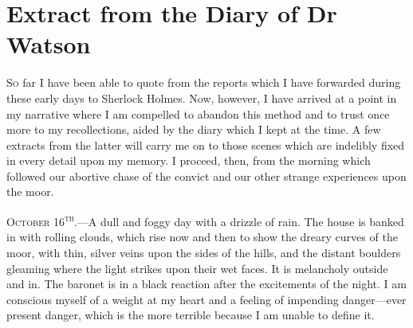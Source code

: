 \chapter{Extract from the Diary of Dr Watson}
\lettrine[lines=1]{S}{o} far I have been able to quote from the reports which I have forwarded during these early days to Sherlock Holmes. Now, however, I have arrived at a point in my narrative where I am compelled to abandon this method and to trust once more to my recollections, aided by the diary which I kept at the time. A few extracts from the latter will carry me on to those scenes which are indelibly fixed in every detail upon my memory. I proceed, then, from the morning which followed our abortive chase of the convict and our other strange experiences upon the moor.
\vfill

\textsc{October 16\textsuperscript{th}.}---A dull and foggy day with a drizzle of rain. The house is banked in with rolling clouds, which rise now and then to show the dreary curves of the moor, with thin, silver veins upon the sides of the hills, and the distant boulders gleaming where the light strikes upon their wet faces. It is melancholy outside and in. The baronet is in a black reaction after the excitements of the night. I am conscious myself of a weight at my heart and a feeling of impending danger---ever present danger, which is the more terrible because I am unable to define it.

